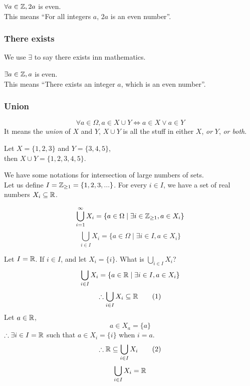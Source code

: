 \documentclass[a4paper]{article}
\begin{document}
\begin{eg}
$\forall a \in \mathbb{Z}, 2a$ is even.\\
This means ``For all integers $a$, $2a$ is an even number''.
\end{eg}

\subsubsection{There exists}
\begin{notation}
We use $\exists$ to say there exists inn mathematics.
\end{notation}

\begin{eg}
$\exists a \in \mathbb{Z}, a$ is even.\\
This means ``There exists an integer $a$, which is an even number''.
\end{eg}

\subsubsection{Union}
\begin{defi}[Unions]
\[
	\forall a \in \Omega, a \in X \cup Y \iff a \in X \lor a \in Y
\]
It means the \emph{union} of $X$ and $Y$, $X \cup Y$ is all the stuff in either $X$, \emph{or} $Y$, \emph{or both}.
\end{defi}
\begin{eg}
Let $X = \{ 1, 2, 3 \}$ and $Y= \{ 3, 4, 5 \}$,\\
then $X \cup Y = \{ 1, 2, 3, 4, 5 \}$.
\end{eg}
We have some notations for intersection of large numbers of sets.\\
Let us define $I = \mathbb{Z}_{\geq1} = \{1,2,3,...\}$. For every $i \in I$, we have a set of real numbers $X_i \subseteq \mathbb{R}$.
\begin{notation}
$$\bigcup^\infty_{i=1} X_i = \{a \in \Omega \mid \exists i \in \mathbb{Z}_{\geq1}, a \in X_i\}$$
$$\bigcup_{i \in I} X_i = \{a \in \Omega \mid \exists i \in I, a \in X_i\}$$
\end{notation}

\begin{eg}
Let $I = \mathbb{R}$.
If $i \in I$, and let $X_i = \{i\}$.
What is $\bigcup_{i \in I} X_i$?
$$\bigcup_{i \in I} X_i = \{a \in \mathbb{R} \mid \exists i \in I, a \in X_i\}$$
\[
	\therefore \bigcup_{i \in I} X_i \subseteq \mathbb{R} \tag{1}
\]
Let $a \in \mathbb{R}$,
\[
	a \in X_a = \{a\} \tag{by definition}
\]
$\therefore \exists i \in I = \mathbb{R}$ such that $a \in X_i = \{i\}$ when $i = a$.
\[
	\therefore \mathbb{R} \subseteq \bigcup_{i \in I} X_i \tag{2}
\]
$$\bigcup_{i \in I} X_i = \mathbb{R}$$
\end{eg}
\end{document}

